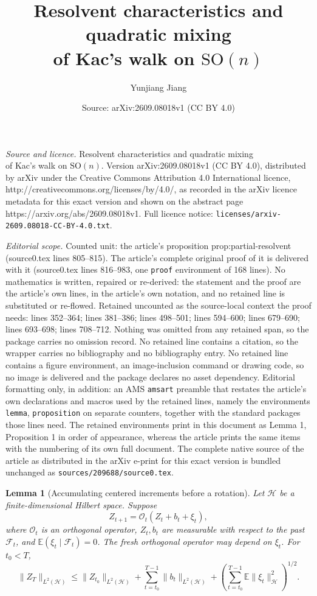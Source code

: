 \documentclass[10pt,a4paper]{amsart}
\title{Resolvent characteristics and quadratic mixing\\of Kac's walk on $\mathrm{SO}(n)$}
\author{Yunjiang Jiang}
\date{Source: arXiv:2609.08018v1 (CC BY 4.0)}
\newtheorem{lemma}{Lemma}
\newcommand{\E}{\mathbb E}
\begin{document}
\maketitle

\noindent\emph{Source and licence.} Resolvent characteristics and quadratic mixing\\of Kac's walk on $\mathrm{SO}(n)$. Version arXiv:2609.08018v1 (CC BY 4.0), distributed by arXiv under the Creative Commons Attribution 4.0 International licence, http://creativecommons.org/licenses/by/4.0/, as recorded in the arXiv licence metadata for this exact version and shown on the abstract page https://arxiv.org/abs/2609.08018v1. Full licence notice: \texttt{licenses/arxiv-2609.08018-CC-BY-4.0.txt}.\par\smallskip

\noindent\textit{Editorial scope.} Counted unit: the article's proposition prop:partial-resolvent (source0.tex lines 805--815). The article's complete original proof of it is delivered with it (source0.tex lines 816--983, one \texttt{proof} environment of 168 lines). No mathematics is written, repaired or re-derived: the statement and the proof are the article's own lines, in the article's own notation, and no retained line is substituted or re-flowed.  Retained uncounted as the source-local context the proof needs: lines 352--364; lines 381--386; lines 498--501; lines 594--600; lines 679--690; lines 693--698; lines 708--712.  Nothing was omitted from any retained span, so the package carries no omission record.  No retained line contains a citation, so the wrapper carries no bibliography and no bibliography entry.  No retained line contains a figure environment, an image-inclusion command or drawing code, so no image is delivered and the package declares no asset dependency.  Editorial formatting only, in addition: an AMS \texttt{amsart} preamble that restates the article's own declarations and macros used by the retained lines, namely the environments \texttt{lemma}, \texttt{proposition} on separate counters, together with the standard packages those lines need.  The retained environments print in this document as Lemma 1, Proposition 1 in order of appearance, whereas the article prints the same items with the numbering of its own full document.  The complete native source of the article as distributed in the arXiv e-print for this exact version is bundled unchanged as \texttt{sources/209688/source0.tex}.
\begin{lemma}[Accumulating centered increments before a rotation]\label{lem:rotated-energy}
Let $\mathcal H$ be a finite-dimensional Hilbert space. Suppose
\[
 Z_{t+1}=\mathcal O_t(Z_t+b_t+\xi_t),
\]
where $\mathcal O_t$ is an orthogonal operator, $Z_t,b_t$ are measurable with respect to the past $\mathcal F_t$, and $\E(\xi_t\mid\mathcal F_t)=0$. The fresh orthogonal operator may depend on $\xi_t$. For $t_0<T$,
\begin{equation}\label{eq:rotation-energy-lemma}
 \|Z_T\|_{L^2(\mathcal H)}
 \le \|Z_{t_0}\|_{L^2(\mathcal H)}
 +\sum_{t=t_0}^{T-1}\|b_t\|_{L^2(\mathcal H)}
 +\left(\sum_{t=t_0}^{T-1}\E\|\xi_t\|_{\mathcal H}^2\right)^{1/2}.
\end{equation}
\end{lemma}
\end{document}
